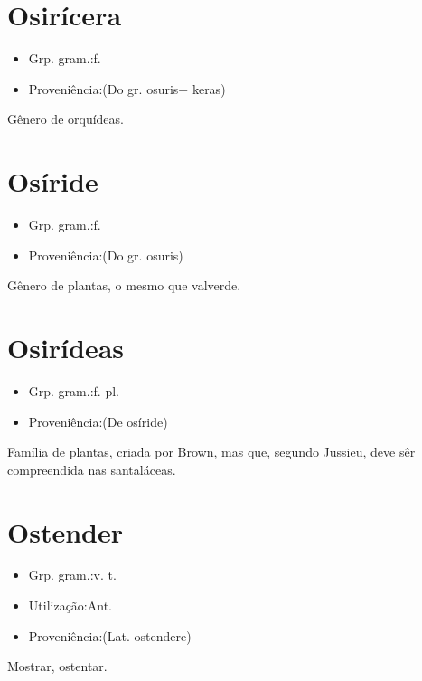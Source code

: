 \section{Osirícera}
\begin{itemize}
\item {Grp. gram.:f.}
\end{itemize}
\begin{itemize}
\item {Proveniência:(Do gr. \textunderscore osuris\textunderscore  + \textunderscore keras\textunderscore )}
\end{itemize}
Gênero de orquídeas.
\section{Osíride}
\begin{itemize}
\item {Grp. gram.:f.}
\end{itemize}
\begin{itemize}
\item {Proveniência:(Do gr. \textunderscore osuris\textunderscore )}
\end{itemize}
Gênero de plantas, o mesmo que \textunderscore valverde\textunderscore .
\section{Osirídeas}
\begin{itemize}
\item {Grp. gram.:f. pl.}
\end{itemize}
\begin{itemize}
\item {Proveniência:(De \textunderscore osíride\textunderscore )}
\end{itemize}
Família de plantas, criada por Brown, mas que, segundo Jussieu, deve sêr compreendida nas santaláceas.
\section{Ostender}
\begin{itemize}
\item {Grp. gram.:v. t.}
\end{itemize}
\begin{itemize}
\item {Utilização:Ant.}
\end{itemize}
\begin{itemize}
\item {Proveniência:(Lat. \textunderscore ostendere\textunderscore )}
\end{itemize}
Mostrar, ostentar.
